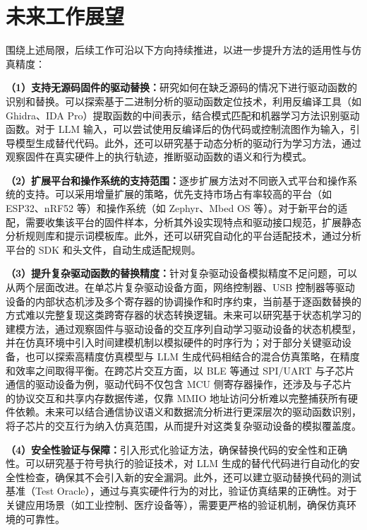 \section{未来工作展望}
\label{sec:future}

围绕上述局限，后续工作可沿以下方向持续推进，以进一步提升方法的适用性与仿真精度：

\textbf{（1）支持无源码固件的驱动替换：}研究如何在缺乏源码的情况下进行驱动函数的识别和替换。可以探索基于二进制分析的驱动函数定位技术，利用反编译工具（如 Ghidra、IDA Pro）提取函数的中间表示，结合模式匹配和机器学习方法识别驱动函数。对于 LLM 输入，可以尝试使用反编译后的伪代码或控制流图作为输入，引导模型生成替代代码。此外，还可以研究基于动态分析的驱动行为学习方法，通过观察固件在真实硬件上的执行轨迹，推断驱动函数的语义和行为模式。

\textbf{（2）扩展平台和操作系统的支持范围：}逐步扩展方法对不同嵌入式平台和操作系统的支持。可以采用增量扩展的策略，优先支持市场占有率较高的平台（如 ESP32、nRF52 等）和操作系统（如 Zephyr、Mbed OS 等）。对于新平台的适配，需要收集该平台的固件样本，分析其外设实现特点和驱动接口规范，扩展静态分析规则库和提示词模板库。此外，还可以研究自动化的平台适配技术，通过分析平台的 SDK 和头文件，自动生成适配规则。

\textbf{（3）提升复杂驱动函数的替换精度：}针对复杂驱动设备模拟精度不足问题，可以从两个层面改进。在单芯片复杂驱动设备方面，网络控制器、USB 控制器等驱动设备的内部状态机涉及多个寄存器的协调操作和时序约束，当前基于逐函数替换的方式难以完整复现这类跨寄存器的状态转换逻辑。未来可以研究基于状态机学习的建模方法，通过观察固件与驱动设备的交互序列自动学习驱动设备的状态机模型，并在仿真环境中引入时间建模机制以模拟硬件的时序行为；对于部分关键驱动设备，也可以探索高精度仿真模型与 LLM 生成代码相结合的混合仿真策略，在精度和效率之间取得平衡。在跨芯片交互方面，以 BLE 等通过 SPI/UART 与子芯片通信的驱动设备为例，驱动代码不仅包含 MCU 侧寄存器操作，还涉及与子芯片的协议交互和共享内存数据传递，仅靠 MMIO 地址访问分析难以完整捕获所有硬件依赖。未来可以结合通信协议语义和数据流分析进行更深层次的驱动函数识别，将子芯片的交互行为纳入仿真范围，从而提升对这类复杂驱动设备的模拟覆盖度。

\textbf{（4）安全性验证与保障：}引入形式化验证方法，确保替换代码的安全性和正确性。可以研究基于符号执行的验证技术，对 LLM 生成的替代代码进行自动化的安全性检查，确保其不会引入新的安全漏洞。此外，还可以建立驱动替换代码的测试基准（Test Oracle），通过与真实硬件行为的对比，验证仿真结果的正确性。对于关键应用场景（如工业控制、医疗设备等），需要更严格的验证机制，确保仿真环境的可靠性。
